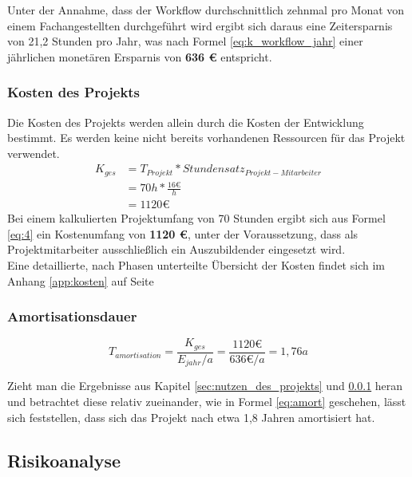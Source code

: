 \documentclass[12pt, xcolor=dvipsnames]{scrartcl}
\begin{document}
Unter der Annahme, dass der Workflow durchschnittlich zehnmal pro Monat von einem Fachangestellten durchgeführt wird ergibt sich daraus eine Zeitersparnis von 21,2 Stunden pro Jahr, was nach Formel \ref{eq:k_workflow_jahr} einer jährlichen monetären Ersparnis von \textbf{636 \euro{}} entspricht.


\subsubsection{Kosten des Projekts}
\label{sec:kosten_des_projekts}

Die Kosten des Projekts werden allein durch die Kosten der Entwicklung bestimmt. Es werden keine nicht bereits vorhandenen Ressourcen für das Projekt verwendet.
\begin{equation} \label{eq:4}
\begin{split}
	K_{ges}	&= T_{Projekt} * Stundensatz_{Projekt-Mitarbeiter} \\
			& = 70h * \frac{16 \euro}{h} \\
			& = 1120 \euro
\end{split}
\end{equation}
Bei einem kalkulierten Projektumfang von 70 Stunden ergibt sich aus Formel \ref{eq:4} ein Kostenumfang von \textbf{1120 \euro{}}, unter der Voraussetzung, dass als Projektmitarbeiter ausschließlich ein Auszubildender eingesetzt wird. \\


Eine detaillierte, nach Phasen unterteilte Übersicht der Kosten findet sich im Anhang \ref{app:kosten} auf Seite \pageref{app:kosten}

\subsubsection{Amortisationsdauer}

\begin{equation} \label{eq:amort}
	T_{amortisation} = \frac{K_{ges}}{E_{jahr} / a} = \frac{1120 \euro}{636 \euro / a} = 1,76a
\end{equation}

Zieht man die Ergebnisse aus Kapitel \ref{sec:nutzen_des_projekts} und \ref{sec:kosten_des_projekts} heran und betrachtet diese relativ zueinander, wie in Formel \ref{eq:amort} geschehen, lässt sich feststellen, dass sich das Projekt nach etwa 1,8 Jahren amortisiert hat.



\subsection{Risikoanalyse}
\end{document}
